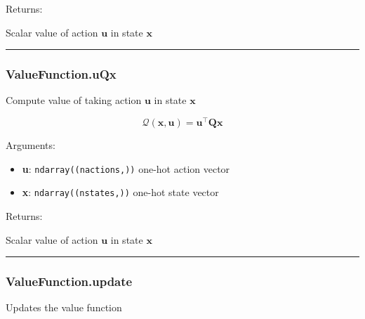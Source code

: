 Returns:

Scalar value of action \(\mathbf u\) in state \(\mathbf x\)

\begin{center}\rule{0.5\linewidth}{\linethickness}\end{center}

\subsubsection{ValueFunction.uQx}\label{valuefunction.uqx}

\begin{Shaded}
\begin{Highlighting}[]
\end{Highlighting}
\end{Shaded}

Compute value of taking action \(\mathbf u\) in state \(\mathbf x\)

\[
\mathcal Q(\mathbf x, \mathbf u) = \mathbf u^\top \mathbf Q \mathbf x
\]

Arguments:

\begin{itemize}
\tightlist
\item
  \textbf{u}: \texttt{ndarray((nactions,))} one-hot action vector
\item
  \textbf{x}: \texttt{ndarray((nstates,))} one-hot state vector
\end{itemize}

Returns:

Scalar value of action \(\mathbf u\) in state \(\mathbf x\)

\begin{center}\rule{0.5\linewidth}{\linethickness}\end{center}

\subsubsection{ValueFunction.update}\label{valuefunction.update}

\begin{Shaded}
\begin{Highlighting}[]
\end{Highlighting}
\end{Shaded}

Updates the value function

